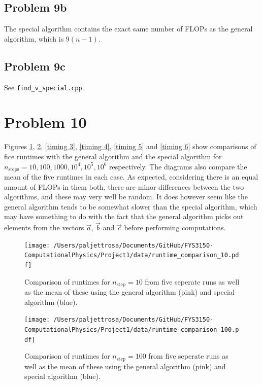 \documentclass[english,notitlepage]{revtex4-1}  %
\begin{document}
\subsection*{Problem 9b}
The special algorithm contains the exact same number of FLOPs as the general algorithm, which is $9(n-1)$.

\subsection*{Problem 9c}
See \verb|find_v_special.cpp|.


\section*{Problem 10}
Figures \ref{timing 1}, \ref{timing 2}, \ref{timing 3}, \ref{timing 4}, \ref{timing 5} and \ref{timing 6} show comparisons of fice runtimes with the general algorithm and the special algorithm for $n_\text{steps} = 10, 100, 1000, 10^4, 10^5, 10^6$ respectively. The diagrams also compare the mean of the five runtimes in each case. As expected, considering there is an equal amount of FLOPs in them both, there are minor differences between the two algorithms, and these may very well be random. It does however seem like the general algorithm tends to be somewhat slower than the special algorithm, which may have something to do with the fact that the general algorithm picks out elements from the vectors $\vec{a}$, $\vec{b}$ and $\vec{c}$ before performing computations.

\begin{figure}[h!]
    \vspace*{20pt}
    \centering 
    \texttt{[image: /Users/paljettrosa/Documents/GitHub/FYS3150-ComputationalPhysics/Project1/data/runtime\_comparison\_10.pdf]} %
    \caption{Comparison of runtimes for $n_\text{step} = 10$ from five seperate runs as well as the mean of these using the general algorithm (pink) and special algorithm (blue).}
    \label{timing 1}
\end{figure}

\begin{figure}[h!]
    \centering 
    \texttt{[image: /Users/paljettrosa/Documents/GitHub/FYS3150-ComputationalPhysics/Project1/data/runtime\_comparison\_100.pdf]} %
    \caption{Comparison of runtimes for $n_\text{step} = 100$ from five seperate runs as well as the mean of these using the general algorithm (pink) and special algorithm (blue).}
    \label{timing 2}
\end{figure}
\end{document}
